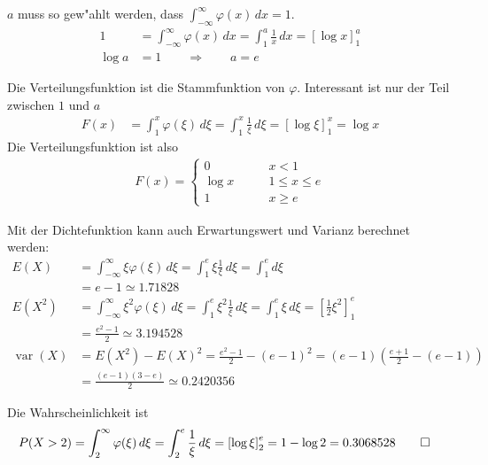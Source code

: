 \begin{loesung}
\begin{teilaufgaben}
\item
$a$ muss so gew"ahlt werden, dass
$\int_{-\infty}^\infty  \varphi(x)\,dx=1$.
\begin{align*}
1&=
\int_{-\infty}^{\infty}\varphi(x)\,dx
=
\int_1^a \frac1x\,dx
=
\left[
\log x
\right]_1^a
\\
\log a&=1\qquad \Rightarrow \qquad a=e
\end{align*}
\item
Die Verteilungsfunktion ist die Stammfunktion von $\varphi$. Interessant ist
nur der Teil zwischen $1$ und $a$
\begin{align*}
F(x)&=\int_1^x \varphi(\xi)\,d\xi=\int_1^x\frac1{\xi}\,d\xi=\left[\log\xi\right]_1^x=\log x
\end{align*}
Die Verteilungsfunktion ist also
\begin{align*}
F(x)=\begin{cases}
0&\qquad x < 1\\
\log x&\qquad 1\le x\le e\\
1&\qquad x \ge e
\end{cases}
\end{align*}
\item
Mit der Dichtefunktion kann auch Erwartungswert und Varianz berechnet werden:
\begin{align*}
E(X)
&=
\int_{-\infty}^\infty \xi\varphi(\xi)\,d\xi
=
\int_1^e\xi\frac1\xi\,d\xi
=
\int_1^ed\xi\\
&=e-1\simeq 1.71828
\\
E(X^2)
&=
\int_{-\infty}^\infty \xi^2\varphi(\xi)\,d\xi
=
\int_1^e\xi^2\frac1\xi\,d\xi
=
\int_1^e\xi\,d\xi=\left[\frac12\xi^2\right]_1^e\\
&=\frac{e^2 -1}2
\simeq 3.194528
\\
\operatorname{var}(X)
&=
E(X^2)-E(X)^2=\frac{e^2-1}2-(e-1)^2
=
(e-1)\left(
\frac{e+1}2-(e-1)
\right)
\\
&=
\frac{(e-1)(3-e)}2
\simeq
0.2420356
\end{align*}
\item
Die Wahrscheinlichkeit ist
\begin{align*}
P(X>2)
&=
\int_2^\infty\varphi(\xi)\,d\xi =\int_2^e\frac1\xi\,d\xi=\left[\log\xi\right]_2^e
=1-\log 2=0.3068528
\qedhere
\end{align*}
\end{teilaufgaben}
\end{loesung}

